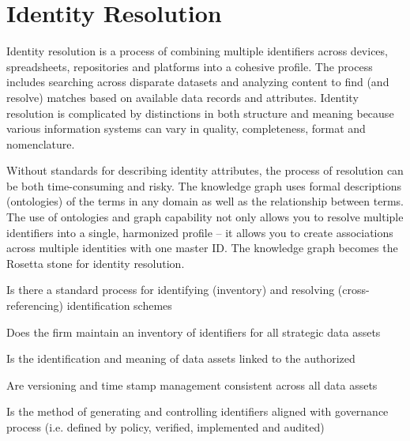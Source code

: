 \section{Identity Resolution}\label{sec:ekgmm-b-2-1} %

Identity resolution is a process of combining multiple identifiers across devices, spreadsheets, repositories and
platforms into a cohesive profile.
The process includes searching across disparate datasets and analyzing content to find (and resolve) matches based
on available data records and attributes.
Identity resolution is complicated by distinctions in both structure and meaning because various information systems
can vary in quality, completeness, format and nomenclature.

\kgmmekgrationalesection

Without standards for describing identity attributes, the process of resolution can be both time-consuming and risky.
The knowledge graph uses formal descriptions (ontologies) of the terms in any domain as well as the relationship
between terms.
The use of ontologies and graph capability not only allows you to resolve multiple identifiers into a single,
harmonized profile -- it allows you to create associations across multiple identities with one master ID.
The knowledge graph becomes the Rosetta stone for identity resolution.

\kgmmcorequestionssection

\begin{core-questions}

  \item [\thesection.1] Is there a standard process for identifying (inventory) and resolving (cross-referencing)
                        identification schemes
  \item [\thesection.2] Does the firm maintain an inventory of identifiers for all strategic data assets
  \item [\thesection.3] Is the identification and meaning of data assets linked to the authorized 
  \item [\thesection.4] Are versioning and time stamp management consistent across all data assets
  \item [\thesection.5] Is the method of generating and controlling identifiers aligned with governance process
                        (i.e. defined by policy, verified, implemented and audited)

\end{core-questions}

